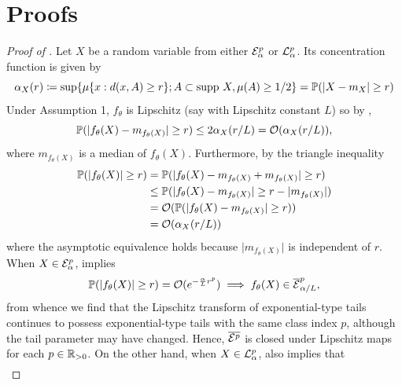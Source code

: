 \documentclass[twoside]{article}
\theoremstyle{definition}
\theoremstyle{remark}
\begin{document}

\clearpage
\appendix

{\onecolumn
\section{Proofs}
\label{sec:proofs}

\begin{proof}[Proof of ]
  \label{proof:distn_class_closed}
  Let $X$ be a random variable from either $\mathcal{E}_\alpha^p$
  or $\mathcal{L}_\alpha^p$.
  Its concentration function
  \cite[Equation 1.6]{ledoux2001concentration}
  is given by
  \[
    \alpha_X(r)
    \coloneqq \sup \{ \mu\{x : d(x,A) \geq r\}; A \subset \text{supp}~X, \mu(A) \geq 1/2\}
    = \mathbb{P}(\lvert X - m_X \rvert \geq r)
  \]
  Under Assumption 1, $f_\theta$ is Lipschitz (say with Lipschitz
  constant $L$) so by \cite[Proposition 1.3]{ledoux2001concentration},
  \[
    \mathbb{P}(\lvert f_\theta(X) - m_{f_\theta(X)}\rvert \geq r)
    \leq 2 \alpha_X(r/L)
    = \mathcal{O}(\alpha_X(r/L)),
  \]
  where $m_{f_\theta(X)}$ is a median of $f_\theta(X)$.
  Furthermore, by the triangle inequality
  \begin{align}
    \mathbb{P}(\lvert f_\theta(X) \rvert \geq r)
    &= \mathbb{P}(\lvert f_\theta(X) - m_{f_\theta(X)} + m_{f_\theta(X)} \rvert \geq r) \nonumber\\
    &\leq \mathbb{P}(\lvert f_\theta(X) - m_{f_\theta(X)}\rvert \geq r - \lvert m_{f_\theta(X)}\rvert ) \nonumber\\
    &= \mathcal{O}(\mathbb{P}(\lvert f_\theta(X) - m_{f_\theta(X)}\rvert \geq r)) \nonumber\\
    &= \mathcal{O}(\alpha_X(r/L)) \label{eq:pushforward-conc-fn}
  \end{align}
  where the asymptotic equivalence holds because $\lvert m_{f_\theta(X)} \rvert$ is independent of $r$.
  When $X \in \mathcal{E}_\alpha^p$,  implies
  \[
    \mathbb{P}(\lvert f_\theta(X) \rvert \geq r)
    = \mathcal{O}(e^{-\frac{\alpha}{L} r^p}) \implies f_\theta(X) \in \overline{\mathcal{E}}_{\alpha/L}^p,
  \]
  from whence we find that the Lipschitz transform of exponential-type
  tails continues to possess exponential-type tails with the same
  class index $p$, although the tail parameter may have changed. Hence,
  $\overline{\mathcal{E}^p}$ is closed under Lipschitz maps for each $p \in \mathbb{R}_{>0}$.
  On the other hand, when $X \in \mathcal{L}_\alpha^p$,  also implies that
  \begin{align*}

\end{align*}
\end{proof}}
\end{document}
